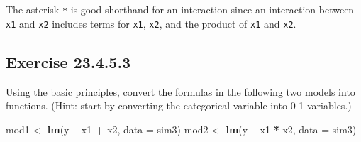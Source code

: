 \documentclass[]{book}
\newenvironment{Shaded}{\begin{snugshade}}{\end{snugshade}}
\newcommand{\ControlFlowTok}[1]{\textcolor[rgb]{0.13,0.29,0.53}{\textbf{#1}}}
\newcommand{\DataTypeTok}[1]{\textcolor[rgb]{0.13,0.29,0.53}{#1}}
\newcommand{\KeywordTok}[1]{\textcolor[rgb]{0.13,0.29,0.53}{\textbf{#1}}}
\newcommand{\NormalTok}[1]{#1}
\newcommand{\OperatorTok}[1]{\textcolor[rgb]{0.81,0.36,0.00}{\textbf{#1}}}
\newcommand{\StringTok}[1]{\textcolor[rgb]{0.31,0.60,0.02}{#1}}
\theoremstyle{plain}
\theoremstyle{remark}
\begin{document}
The asterisk \texttt{*} is good shorthand for an interaction since an
interaction between \texttt{x1} and \texttt{x2} includes terms for
\texttt{x1}, \texttt{x2}, and the product of \texttt{x1} and
\texttt{x2}.

\hypertarget{exercise-23.4.5.3}{%
\subsection*{\texorpdfstring{Exercise
{23.4.5.3}}{Exercise 23.4.5.3}}\label{exercise-23.4.5.3}}

Using the basic principles, convert the formulas in the following two
models into functions. (Hint: start by converting the categorical
variable into 0-1 variables.)

\begin{Shaded}
\begin{Highlighting}[]
\NormalTok{mod1 <-}\StringTok{ }\KeywordTok{lm}\NormalTok{(y }\OperatorTok{~}\StringTok{ }\NormalTok{x1 }\OperatorTok{+}\StringTok{ }\NormalTok{x2, }\DataTypeTok{data =}\NormalTok{ sim3)}
\NormalTok{mod2 <-}\StringTok{ }\KeywordTok{lm}\NormalTok{(y }\OperatorTok{~}\StringTok{ }\NormalTok{x1 }\OperatorTok{*}\StringTok{ }\NormalTok{x2, }\DataTypeTok{data =}\NormalTok{ sim3)}
\end{Highlighting}
\end{Shaded}

\begin{Shaded}
\end{Shaded}
\end{document}
